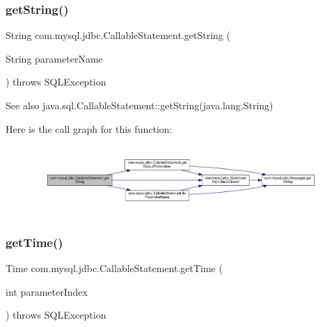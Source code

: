 \subsubsection{\texorpdfstring{get\+String()}{getString()}\hspace{0.1cm}{\footnotesize\ttfamily [2/2]}}
{\footnotesize\ttfamily String com.\+mysql.\+jdbc.\+Callable\+Statement.\+get\+String (\begin{DoxyParamCaption}\item[{String}]{parameter\+Name }\end{DoxyParamCaption}) throws S\+Q\+L\+Exception}

\begin{DoxySeeAlso}{See also}
java.\+sql.\+Callable\+Statement\+::get\+String(java.\+lang.\+String) 
\end{DoxySeeAlso}
Here is the call graph for this function\+:\nopagebreak
\begin{figure}[H]
\begin{center}
\leavevmode
\includegraphics[width=350pt]{classcom_1_1mysql_1_1jdbc_1_1_callable_statement_aed6520b46a5b20440346fb9a487a8bdf_cgraph}
\end{center}
\end{figure}
\mbox{\label{classcom_1_1mysql_1_1jdbc_1_1_callable_statement_a87f8ac6155e026c518be1266abd3da5c}} 
\subsubsection{\texorpdfstring{get\+Time()}{getTime()}\hspace{0.1cm}{\footnotesize\ttfamily [1/4]}}
{\footnotesize\ttfamily Time com.\+mysql.\+jdbc.\+Callable\+Statement.\+get\+Time (\begin{DoxyParamCaption}\item[{int}]{parameter\+Index }\end{DoxyParamCaption}) throws S\+Q\+L\+Exception}

